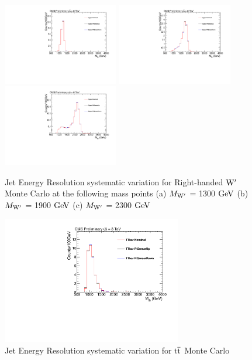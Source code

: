 \begin{figure}[htcb]
\begin{center}
\includegraphics[width=0.45\textwidth]{AN-13-004/figs/Signal_M1300_PtSmearing}
\includegraphics[width=0.45\textwidth]{AN-13-004/figs/Signal_M1900_PtSmearing}
\includegraphics[width=0.45\textwidth]{AN-13-004/figs/Signal_M2300_PtSmearing}
\caption{
Jet Energy Resolution systematic variation for Right-handed $\mathrm{W}^\prime$ Monte Carlo at the following mass points
(a) $M_{\mathrm{W}^\prime}$ = 1300$~\mathrm{GeV}$ 
(b) $M_{\mathrm{W}^\prime}$ = 1900$~\mathrm{GeV}$
(c) $M_{\mathrm{W}^\prime}$ = 2300$~\mathrm{GeV}$ 
}
\label{figs:signalJER}
\end{center}
\end{figure}

\begin{figure}[htcb]
\begin{center}
\includegraphics[width=0.7\textwidth]{AN-13-004/figs/TTbar_PtSmearing}
\caption{Jet Energy Resolution systematic variation for $\mathrm{t\overline{t}}$ Monte Carlo}
\label{figs:ttbarJER}
\end{center}
\end{figure}

